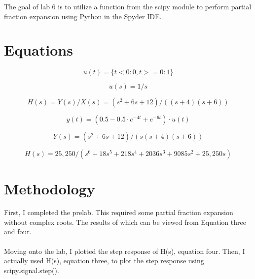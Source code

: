 \documentclass[12pt]{report}
\begin{document}
The goal of lab 6 is to utilize a function from the scipy module to perform partial fraction expansion using Python in the Spyder IDE.

\section{Equations}
    \begin{equation}
        u(t) = \{t<0:0, t>=0:1\}
    \end{equation}
 
    \begin{equation}
        u(s) = 1/s
    \end{equation}
 
    \begin{equation}
       H(s) = Y (s)/X(s) = (s^2 + 6s + 12)/((s + 4)(s + 6))
    \end{equation}
    
     \begin{equation}
        y(t) = (0.5 − 0.5 \cdot e^{−4t} + e^{-6t} ) \cdot u(t)
    \end{equation}
    
    \begin{equation}
        Y (s) = (s^2 + 6s + 12)/(s(s + 4)(s + 6))
    \end{equation}
    
    \begin{equation}
        H(s) = 25,250/(s^6+18s^5+218s^4+2036s^3+9085s^2+25,250s)
    \end{equation}
\section{Methodology}


    \paragraph{} First, I completed the prelab. This required some partial fraction expansion without complex roots. The results of which can be viewed from Equation three and four. 
    \paragraph{} Moving onto the lab, I plotted the step response of H(s), equation four. Then, I actually used H(s), equation three, to plot the step response using scipy.signal.step(). 
\end{document}
